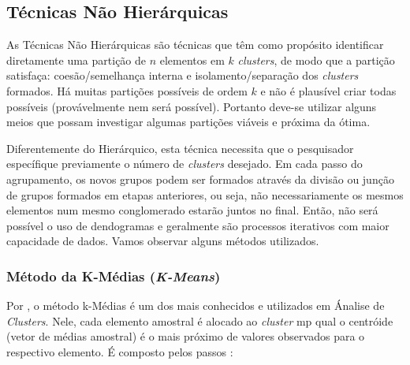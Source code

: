 \documentclass[
  openany]{book}
\begin{document}
\hypertarget{tuxe9cnicas-nuxe3o-hieruxe1rquicas}{%
\subsection{Técnicas Não Hierárquicas}\label{tuxe9cnicas-nuxe3o-hieruxe1rquicas}}

As Técnicas Não Hierárquicas são técnicas que têm como propósito identificar diretamente uma partição de \(n\) elementos em \(k\) \emph{clusters}, de modo que a partição satisfaça: coesão/semelhança interna e isolamento/separação dos \emph{clusters} formados. Há muitas partições possíveis de ordem \(k\) e não é plausível criar todas possíveis (provávelmente nem será possível). Portanto deve-se utilizar alguns meios que possam investigar algumas partições viáveis e próxima da ótima.

Diferentemente do Hierárquico, esta técnica necessita que o pesquisador específique previamente o número de \emph{clusters} desejado. Em cada passo do agrupamento, os novos grupos podem ser formados através da divisão ou junção de grupos formados em etapas anteriores, ou seja, não necessariamente os mesmos elementos num mesmo conglomerado estarão juntos no final. Então, não será possível o uso de dendogramas e geralmente são processos iterativos com maior capacidade de dados. Vamos observar alguns métodos utilizados.

\hypertarget{muxe9todo-da-k-muxe9dias-k-means}{%
\subsubsection{\texorpdfstring{Método da K-Médias (\emph{K-Means})}{Método da K-Médias (K-Means)}}\label{muxe9todo-da-k-muxe9dias-k-means}}

Por \citet{hartigan1979algorithm}, o método k-Médias é um dos mais conhecidos e utilizados em Ánalise de \emph{Clusters}. Nele, cada elemento amostral é alocado ao \emph{cluster} mp qual o centróide (vetor de médias amostral) é o mais próximo de valores observados para o respectivo elemento. É composto pelos passos \citep{mingoti2007analise}:
\end{document}
